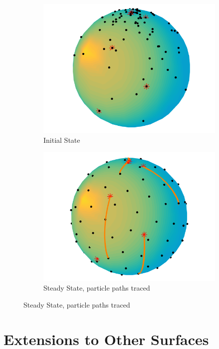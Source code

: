 \documentclass{article}
\begin{document}
\begin{figure}
\centering
\begin{subfigure}{.5\textwidth}
  \centering
  \includegraphics[width=\linewidth]{t_0.png}
  \caption{Initial State}
  \label{fig1}
\end{subfigure}%
\begin{subfigure}{.5\textwidth}
  \centering
  \includegraphics[width=\linewidth]{t_100.png}
  \caption{Steady State, particle paths traced}
  \label{fig2}
\end{subfigure}
\label{fig_main}
\end{figure}

\section{Extensions to Other Surfaces}
\end{document}
